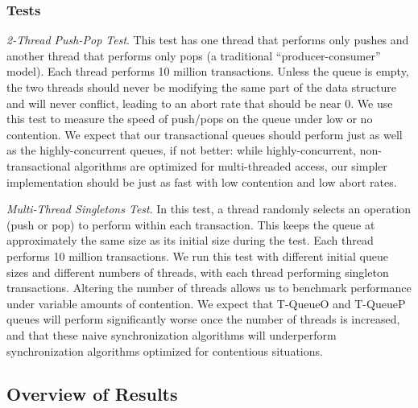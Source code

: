\subsubsection{Tests}
    \emph{2-Thread Push-Pop Test}. This test has one thread that performs only pushes and another thread that performs only pops (a traditional ``producer-consumer'' model). Each thread performs 10 million transactions. Unless the queue is empty, the two threads should never be modifying the same part of the data structure and will never conflict, leading to an abort rate that should be near 0. We use this test to measure the speed of push/pops on the queue under low or no contention. We expect that our transactional queues should perform just as well as the highly-concurrent queues, if not better: while highly-concurrent, non-transactional algorithms are optimized for multi-threaded access, our simpler implementation should be just as fast with low contention and low abort rates.

\emph{Multi-Thread Singletons Test}.
    In this test, a thread randomly selects an operation (push or pop) to perform within each transaction. This keeps the queue at approximately the same size as its initial size during the test. Each thread performs 10 million transactions. We run this test with different initial queue sizes and different numbers of threads, with each thread performing singleton transactions. Altering the number of threads allows us to benchmark performance under variable amounts of contention. We expect that T-QueueO and T-QueueP queues will perform significantly worse once the number of threads is increased, and that these naive synchronization algorithms will underperform synchronization algorithms optimized for contentious situations.

\subsection{Overview of Results}

